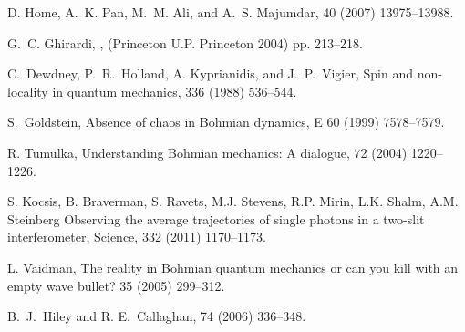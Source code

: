 \documentclass[12pt,preprint,tightenlines]{elsarticle}
\begin{document}
\begin{thebibliography}{40}
D. Home, A.~K. Pan, M.~M. Ali, and A.~S. Majumdar,
  40 (2007) 13975--13988.

G.~C. Ghirardi,
,
\newblock (Princeton U.P. Princeton 2004) pp. 213--218.

C.~Dewdney, P.~R.~Holland,  A. Kyprianidis, and J.~P.~Vigier,
\newblock Spin and non-locality in quantum mechanics,
  336 (1988) 536--544.

S.~Goldstein,
\newblock Absence of chaos in Bohmian dynamics,
  E 60  (1999) 7578--7579.

R. Tumulka,
\newblock Understanding Bohmian mechanics: A dialogue,
 72 (2004) 1220--1226.

S. Kocsis, B. Braverman, S. Ravets, M.J. Stevens, R.P. Mirin, L.K. Shalm, A.M. Steinberg
\newblock Observing the average trajectories of single photons in a two-slit interferometer,
\newblock
Science, 332  (2011) 1170--1173.

L. Vaidman,
\newblock The reality in Bohmian quantum mechanics or can you kill with an
  empty wave bullet?
  35 (2005) 299--312.

B.~J.~Hiley and R. E.~Callaghan,
  74 (2006) 336--348.
\end{thebibliography}
\end{document}
